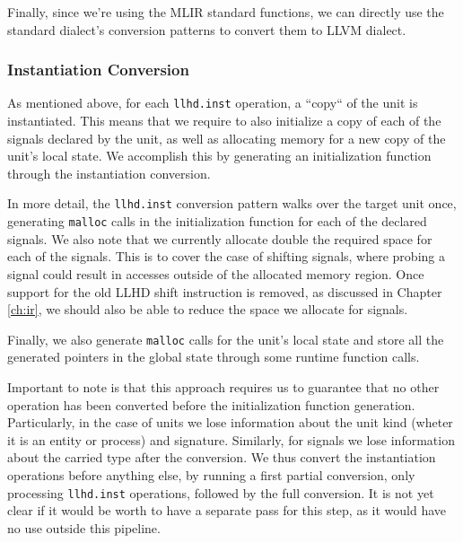 Finally, since we're using the MLIR standard functions, we can directly use the standard dialect's conversion patterns to convert them to LLVM dialect.


\subsubsection{Instantiation Conversion}
As mentioned above, for each \texttt{llhd.inst} operation, a “copy“ of the unit is instantiated. This means that we require to also initialize a copy of each of the signals declared by the unit, as well as allocating memory for a new copy of the unit's local state. We accomplish this by generating an initialization function through the instantiation conversion.

In more detail, the \texttt{llhd.inst} conversion pattern walks over the target unit once,  generating \texttt{malloc} calls in the initialization function for each of the declared signals. We also note that we currently allocate double the required space for each of the signals. This is to cover the case of shifting signals, where probing a signal could result in accesses outside of the allocated memory region. Once support for the old LLHD shift instruction is removed, as discussed in Chapter \ref{ch:ir}, we should also be able to reduce the space we allocate for signals.

Finally, we also generate \texttt{malloc} calls for the unit's local state and store all the generated pointers in the global state through some runtime function calls.

Important to note is that this approach requires us to guarantee that no other operation has been converted before the initialization function generation. Particularly, in the case of units we lose information about the unit kind (wheter it is an entity or process) and signature. Similarly, for signals we lose information about the carried type after the conversion. We thus convert the instantiation operations before anything else, by running a first partial conversion, only processing \texttt{llhd.inst} operations, followed by the full conversion. It is not yet clear if it would be worth to have a separate pass for this step, as it would have no use outside this pipeline.


